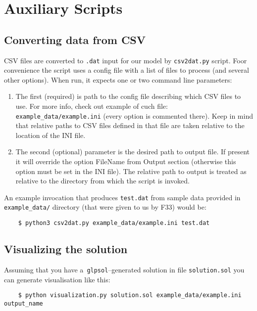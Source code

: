 \section{Auxiliary Scripts}

\subsection{Converting data from CSV}

CSV files are converted to \texttt{.dat} input for our model by \texttt{csv2dat.py} script. Foor convenience the script uses a config file with a list of files to process (and several other options). When run, it expects one or two command line parameters:

\begin{enumerate}
    \item The first (required) is path to the config file describing which CSV files to use. For more info, check out example of cuch file: \texttt{example\_data/example.ini} (every option is commented there). Keep in mind that relative paths to CSV files defined in that file are taken relative to the location of the INI file.
    \item The second (optional) parameter is the desired path to output file. If present it will override the option FileName from Output section (otherwise this option must be set in the INI file). The relative path to output is treated as relative to the directory from which the script is invoked.
\end{enumerate}

An example invocation that produces \texttt{test.dat} from sample data provided in \texttt{example\_data/} directory (that were given to us by F33) would be:

\begin{verbatim}
    $ python3 csv2dat.py example_data/example.ini test.dat
\end{verbatim}


\subsection{Visualizing the solution}

Assuming that you have a~\texttt{glpsol}--generated solution in file \texttt{solution.sol} you can generate visualisation like this:

\begin{verbatim}
    $ python visualization.py solution.sol example_data/example.ini output_name
\end{verbatim}


